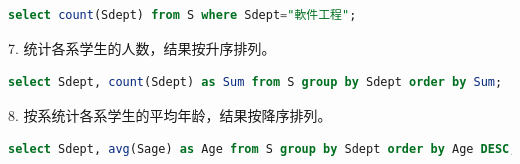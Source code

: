 \documentclass[12pt, a4paper]{report}
\begin{document}
\begin{lstlisting}[language=SQL]
    select count(Sdept) from S where Sdept="軟件工程";
\end{lstlisting}

\begin{figure}[H] %
    \centering %
\end{figure}

7. 统计各系学生的人数，结果按升序排列。\\

\begin{lstlisting}[language=SQL]
    select Sdept, count(Sdept) as Sum from S group by Sdept order by Sum;
\end{lstlisting}

\begin{figure}[H] %
    \centering %
\end{figure}

8. 按系统计各系学生的平均年龄，结果按降序排列。\\

\begin{lstlisting}[language=SQL]
    select Sdept, avg(Sage) as Age from S group by Sdept order by Age DESC;
\end{lstlisting}

\begin{figure}[H] %
    \centering %
\end{figure}
\end{document}

